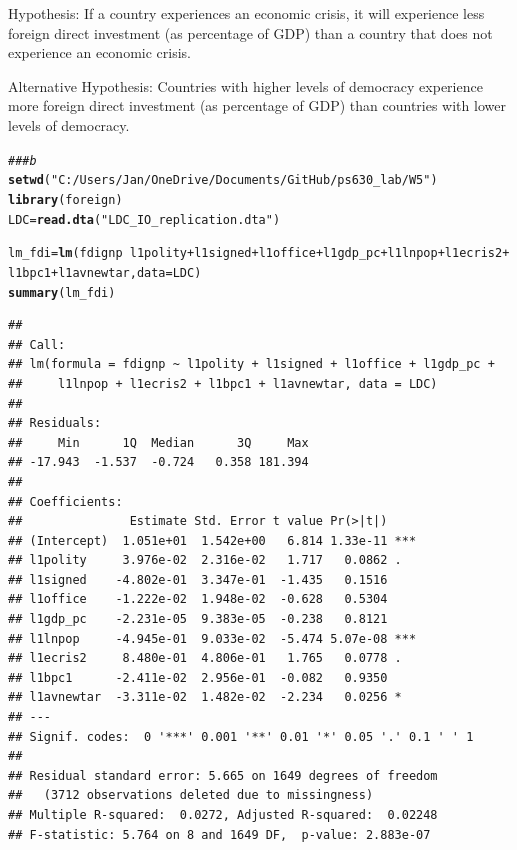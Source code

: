 \documentclass[12pt]{article}\usepackage[]{graphicx}\usepackage[]{color}
\makeatletter
\newcommand{\hlstr}[1]{\textcolor[rgb]{0.192,0.494,0.8}{#1}}%
\newcommand{\hlcom}[1]{\textcolor[rgb]{0.678,0.584,0.686}{\textit{#1}}}%
\newcommand{\hlopt}[1]{\textcolor[rgb]{0,0,0}{#1}}%
\newcommand{\hlstd}[1]{\textcolor[rgb]{0.345,0.345,0.345}{#1}}%
\newcommand{\hlkwb}[1]{\textcolor[rgb]{0.69,0.353,0.396}{#1}}%
\newcommand{\hlkwc}[1]{\textcolor[rgb]{0.333,0.667,0.333}{#1}}%
\newcommand{\hlkwd}[1]{\textcolor[rgb]{0.737,0.353,0.396}{\textbf{#1}}}%
\newenvironment{kframe}{%
 \def\at@end@of@kframe{}%
 \ifinner\ifhmode%
  \def\at@end@of@kframe{\end{minipage}}%
  \begin{minipage}{\columnwidth}%
 \fi\fi%
 \def\FrameCommand##1{\hskip\@totalleftmargin \hskip-\fboxsep
 \colorbox{shadecolor}{##1}\hskip-\fboxsep
     \hskip-\linewidth \hskip-\@totalleftmargin \hskip\columnwidth}%
 \MakeFramed {\advance\hsize-\width
   \@totalleftmargin\z@ \linewidth\hsize
   \@setminipage}}%
 {\par\unskip\endMakeFramed%
 \at@end@of@kframe}
\newenvironment{knitrout}{}{} %
\makeatother
\begin{document}
Hypothesis: If a country experiences an economic crisis, it will experience less foreign direct investment (as percentage of GDP) than a country that does not experience an economic crisis.

Alternative Hypothesis: Countries with higher levels of democracy experience more foreign direct investment (as percentage of GDP) than countries with lower levels of democracy.

\begin{knitrout}
\color{fgcolor}\begin{kframe}
\begin{alltt}
\hlcom{### b}
\hlkwd{setwd}\hlstd{(}\hlstr{"C:/Users/Jan/OneDrive/Documents/GitHub/ps630_lab/W5"}\hlstd{)}
\hlkwd{library}\hlstd{(foreign)}
\hlstd{LDC} \hlkwb{=} \hlkwd{read.dta}\hlstd{(}\hlstr{"LDC_IO_replication.dta"}\hlstd{)}

\hlstd{lm_fdi} \hlkwb{=} \hlkwd{lm}\hlstd{(fdignp} \hlopt{~} \hlstd{l1polity} \hlopt{+} \hlstd{l1signed} \hlopt{+} \hlstd{l1office} \hlopt{+} \hlstd{l1gdp_pc} \hlopt{+} \hlstd{l1lnpop} \hlopt{+} \hlstd{l1ecris2} \hlopt{+}
    \hlstd{l1bpc1} \hlopt{+} \hlstd{l1avnewtar,} \hlkwc{data} \hlstd{= LDC)}
\hlkwd{summary}\hlstd{(lm_fdi)}
\end{alltt}
\begin{verbatim}
## 
## Call:
## lm(formula = fdignp ~ l1polity + l1signed + l1office + l1gdp_pc + 
##     l1lnpop + l1ecris2 + l1bpc1 + l1avnewtar, data = LDC)
## 
## Residuals:
##     Min      1Q  Median      3Q     Max 
## -17.943  -1.537  -0.724   0.358 181.394 
## 
## Coefficients:
##               Estimate Std. Error t value Pr(>|t|)    
## (Intercept)  1.051e+01  1.542e+00   6.814 1.33e-11 ***
## l1polity     3.976e-02  2.316e-02   1.717   0.0862 .  
## l1signed    -4.802e-01  3.347e-01  -1.435   0.1516    
## l1office    -1.222e-02  1.948e-02  -0.628   0.5304    
## l1gdp_pc    -2.231e-05  9.383e-05  -0.238   0.8121    
## l1lnpop     -4.945e-01  9.033e-02  -5.474 5.07e-08 ***
## l1ecris2     8.480e-01  4.806e-01   1.765   0.0778 .  
## l1bpc1      -2.411e-02  2.956e-01  -0.082   0.9350    
## l1avnewtar  -3.311e-02  1.482e-02  -2.234   0.0256 *  
## ---
## Signif. codes:  0 '***' 0.001 '**' 0.01 '*' 0.05 '.' 0.1 ' ' 1
## 
## Residual standard error: 5.665 on 1649 degrees of freedom
##   (3712 observations deleted due to missingness)
## Multiple R-squared:  0.0272,	Adjusted R-squared:  0.02248 
## F-statistic: 5.764 on 8 and 1649 DF,  p-value: 2.883e-07
\end{verbatim}
\end{kframe}
\end{knitrout}
\end{document}
